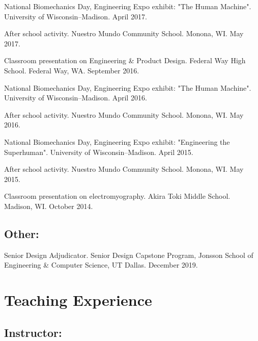 \documentclass[letterpaper, 10pt]{article}
\begin{document}
\begin{compactenum}
    \item National Biomechanics Day, Engineering Expo exhibit: "The Human Machine". University of Wisconsin–Madison. April 2017.
    \item After school activity. Nuestro Mundo Community School. Monona, WI. May 2017.
    \item Classroom presentation on Engineering \& Product Design. Federal Way High School. Federal Way, WA. September 2016.
    \item National Biomechanics Day, Engineering Expo exhibit: "The Human Machine". University of Wisconsin–Madison. April 2016.
    \item After school activity. Nuestro Mundo Community School. Monona, WI. May 2016.
    \item National Biomechanics Day, Engineering Expo exhibit: "Engineering the Superhuman". University of Wisconsin–Madison. April 2015.
    \item After school activity. Nuestro Mundo Community School. Monona, WI. May 2015.
    \item Classroom presentation on electromyography. Akira Toki Middle School. Madison, WI. October 2014. 
\end{compactenum}

\subsection{Other:}
\begin{compactenum}
    \item Senior Design Adjudicator. Senior Design Capstone Program, Jonsson School of Engineering \& Computer Science, UT Dallas. December 2019.
\end{compactenum}

\section{Teaching Experience}

\subsection{Instructor:}
\end{document}
